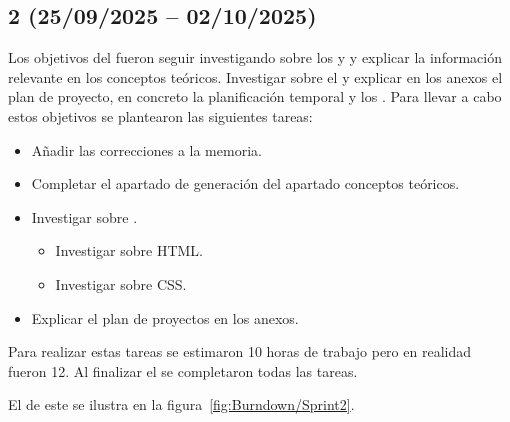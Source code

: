 \subsection{ 2 (25/09/2025 -- 02/10/2025)}
Los objetivos del  fueron seguir investigando sobre los  y  y explicar la información relevante en los conceptos teóricos. Investigar sobre el  y explicar en los anexos el plan de proyecto, en concreto la planificación temporal y los .
Para llevar a cabo estos objetivos se plantearon las siguientes tareas:
\begin{itemize}
\tightlist
	\item Añadir las correcciones a la memoria.
	\item Completar el apartado  de generación del apartado conceptos teóricos.
	\item Investigar sobre .
	\begin{itemize}
	\tightlist
		\item Investigar sobre HTML.
		\item Investigar sobre CSS.
	\end{itemize}
	\item Explicar el plan de proyectos en los anexos.
\end{itemize}

Para realizar estas tareas se estimaron 10 horas de trabajo pero en realidad fueron 12. Al finalizar el  se completaron todas las tareas.

El  de este  se ilustra en la figura~\ref{fig:Burndown/Sprint2}.

